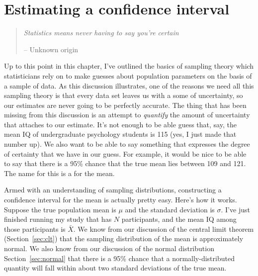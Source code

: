 \section{Estimating a confidence interval\label{sec:ci}}

\begin{quote}
{\it Statistics means never having to say you're certain}

\hspace*{2cm} -- Unknown origin
\end{quote}

\noindent
Up to this point in this chapter, I've outlined the basics of sampling theory which statisticians rely on to make guesses about population parameters on the basis of a sample of data. As this discussion illustrates, one of the reasons we need all this sampling theory is that every data set leaves us with a some of uncertainty, so our estimates are never going to be perfectly accurate. The thing that has been missing from this discussion is an attempt to {\it quantify} the amount of uncertainty that attaches to our estimate. It's not enough to be able guess that, say, the mean IQ of undergraduate psychology students is 115 (yes, I just made that number up). We also want to be able to say something that expresses the degree of certainty that we have in our guess. For example, it would be nice to be able to say that there is a 95\% chance that the true mean lies between 109 and 121. The name for this is a  for the mean.

Armed with an understanding of sampling distributions, constructing a confidence interval for the mean is actually pretty easy. Here's how it works. Suppose the true population mean is $\mu$ and the standard deviation is $\sigma$. I've just finished running my study that has $N$ participants, and the mean IQ among those participants is $\bar{X}$. We know from our discussion of the central limit theorem (Section~\ref{sec:clt}) that the sampling distribution of the mean is approximately normal. We also know from our discussion of the normal distribution Section~\ref{sec:normal} that there is a 95\% chance that a normally-distributed quantity will fall within about two standard deviations of the true mean. 

